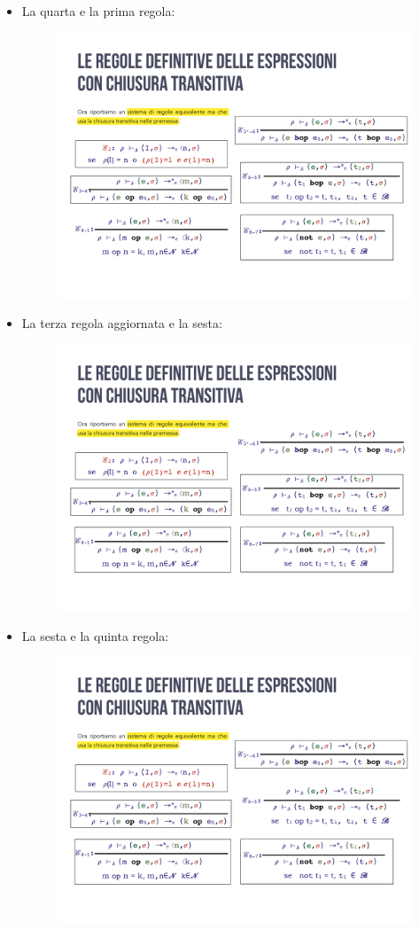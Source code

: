 \documentclass[a4paper]{article}
\begin{document}
\begin{itemize}
 		\item La quarta e la prima regola:
 		\begin{figure}[!htp]
 			\centering
 			\includegraphics[width=.7\textwidth]{img/regola_espressione-up-transitiva-4_1.pdf}
 		\end{figure}
 		
 		\item La terza regola aggiornata e la sesta:
 		\begin{figure}[!htp]
 			\centering
 			\includegraphics[width=.7\textwidth]{img/regola_espressione-up-transitiva-3b_6.pdf}
 		\end{figure}
 		
 		\item La sesta e la quinta regola:
 		\begin{figure}[!htp]
 			\centering
 			\includegraphics[width=.7\textwidth]{img/regola_espressione-up-transitiva-6_5.pdf}
 		\end{figure}\newpage
 		

\end{itemize}
\end{document}
